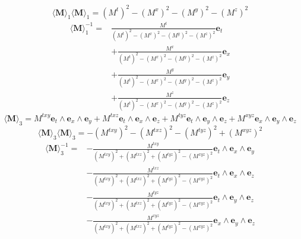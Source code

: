 \documentclass[10pt,fleqn]{report}
\begin{document}
\begin{equation*} \langle \bm{M} \rangle _1 \langle \bm{M} \rangle _1 = {\left ( M^{t} \right ) }^{2} - {\left ( M^{x} \right ) }^{2} - {\left ( M^{y} \right ) }^{2} - {\left ( M^{z} \right ) }^{2} \end{equation*}
  \begin{align*} \langle \bm{M} \rangle _1 ^{-1} =  & \frac{M^{t} }{{\left ( M^{t} \right ) }^{2} - {\left ( M^{x} \right ) }^{2} - {\left ( M^{y} \right ) }^{2} - {\left ( M^{z} \right ) }^{2}} \boldsymbol{e}_{t} \\  &  + \frac{M^{x} }{{\left ( M^{t} \right ) }^{2} - {\left ( M^{x} \right ) }^{2} - {\left ( M^{y} \right ) }^{2} - {\left ( M^{z} \right ) }^{2}} \boldsymbol{e}_{x} \\  &  + \frac{M^{y} }{{\left ( M^{t} \right ) }^{2} - {\left ( M^{x} \right ) }^{2} - {\left ( M^{y} \right ) }^{2} - {\left ( M^{z} \right ) }^{2}} \boldsymbol{e}_{y} \\  &  + \frac{M^{z} }{{\left ( M^{t} \right ) }^{2} - {\left ( M^{x} \right ) }^{2} - {\left ( M^{y} \right ) }^{2} - {\left ( M^{z} \right ) }^{2}} \boldsymbol{e}_{z}  \end{align*} 
\begin{equation*} \langle \bm{M} \rangle _3 = M^{txy}  \boldsymbol{e}_{t}\wedge \boldsymbol{e}_{x}\wedge \boldsymbol{e}_{y} + M^{txz}  \boldsymbol{e}_{t}\wedge \boldsymbol{e}_{x}\wedge \boldsymbol{e}_{z} + M^{tyz}  \boldsymbol{e}_{t}\wedge \boldsymbol{e}_{y}\wedge \boldsymbol{e}_{z} + M^{xyz}  \boldsymbol{e}_{x}\wedge \boldsymbol{e}_{y}\wedge \boldsymbol{e}_{z} \end{equation*}
\begin{equation*} \langle \bm{M} \rangle _3 \langle \bm{M} \rangle _3 = - {\left ( M^{txy} \right ) }^{2} - {\left ( M^{txz} \right ) }^{2} - {\left ( M^{tyz} \right ) }^{2} + {\left ( M^{xyz} \right ) }^{2} \end{equation*}
  \begin{align*} \langle \bm{M} \rangle _3^{-1} =  & - \frac{M^{txy} }{{\left ( M^{txy} \right ) }^{2} + {\left ( M^{txz} \right ) }^{2} + {\left ( M^{tyz} \right ) }^{2} - {\left ( M^{xyz} \right ) }^{2}} \boldsymbol{e}_{t}\wedge \boldsymbol{e}_{x}\wedge \boldsymbol{e}_{y} \\  &  - \frac{M^{txz} }{{\left ( M^{txy} \right ) }^{2} + {\left ( M^{txz} \right ) }^{2} + {\left ( M^{tyz} \right ) }^{2} - {\left ( M^{xyz} \right ) }^{2}} \boldsymbol{e}_{t}\wedge \boldsymbol{e}_{x}\wedge \boldsymbol{e}_{z} \\  &  - \frac{M^{tyz} }{{\left ( M^{txy} \right ) }^{2} + {\left ( M^{txz} \right ) }^{2} + {\left ( M^{tyz} \right ) }^{2} - {\left ( M^{xyz} \right ) }^{2}} \boldsymbol{e}_{t}\wedge \boldsymbol{e}_{y}\wedge \boldsymbol{e}_{z} \\  &  - \frac{M^{xyz} }{{\left ( M^{txy} \right ) }^{2} + {\left ( M^{txz} \right ) }^{2} + {\left ( M^{tyz} \right ) }^{2} - {\left ( M^{xyz} \right ) }^{2}} \boldsymbol{e}_{x}\wedge \boldsymbol{e}_{y}\wedge \boldsymbol{e}_{z}  \end{align*} 
\end{document}
